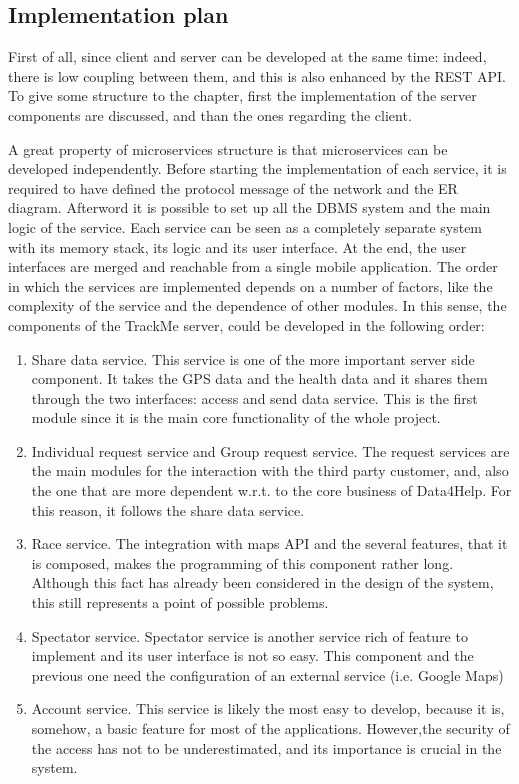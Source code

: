 \subsection{Implementation plan}
First of all, since client and server can be developed at the same time: indeed, there is low coupling
between them, and this is also enhanced by the REST API. To give some structure to the chapter, first the
implementation of the server components are discussed, and than the ones regarding the client. \\ 
 \par 
A great property of microservices structure is that microservices can be developed independently. Before starting the implementation of each service, it is required to have defined the protocol message of the network and the ER diagram.
Afterword it is possible to set up all the DBMS system and the main logic of the service. 
Each service can be seen as a completely separate system with its memory stack, its logic and its user
interface. 
At the end, the user interfaces are merged and reachable from a single mobile application. 
The order in which the services are implemented depends on a number of factors, like the complexity of the
service and the dependence of other modules. 
In this sense, the components of the TrackMe server, could be developed in the following order:
 \begin{enumerate}
\item Share data service.
This service is one of the more important server side component. It takes the GPS data and the health data
and it shares them through the two interfaces: access and send data service. 
This is the first module since it is the main core functionality of the whole project. 
\item Individual request service and Group request service.
The request services are the main modules for the interaction with the third party customer, and, also
the one that are more dependent w.r.t. to the core business of Data4Help. For this reason, it follows 
the share data service.
\item Race service.
The integration with maps API and the several features, that it is composed, makes the programming of this
component rather long. Although this fact has already been considered in the design of the system, this
still represents a point of possible problems.
\item Spectator service.
Spectator service is another service rich of feature to implement and its user interface is not so easy.  
This component and the previous one need the configuration of an external service (i.e. Google Maps) 
\item Account service. 
This service is likely the most easy to develop, because it is, somehow, a basic feature for most of the
applications. 
However,the security of the access has not to be underestimated, and its importance is crucial in the
system.
\end{enumerate}   
